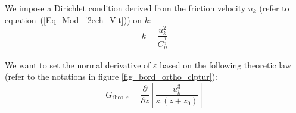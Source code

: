 \newpage


We impose a Dirichlet condition derived from the friction velocity
$u_k$ (refer to equation~(\ref{Eq_Mod_'2ech_Vit})) on $k$:
\begin{equation}
k= \displaystyle\frac{u_k^2}{C_\mu^\frac{1}{2}}
\end{equation}


We want to set the normal derivative of $\varepsilon$ based on the following
theoretic law  (refer to the notations in figure \ref{fig_bord_ortho_clptur}):
\begin{equation}\label{eq_partialep_theo_clptur}
G_{\text{theo},\varepsilon} = \displaystyle\frac{\partial}{\partial z}
 \left[ \displaystyle\frac{u_k^3}{\kappa\, \left(z + z_0\right)}\right]
\end{equation}



